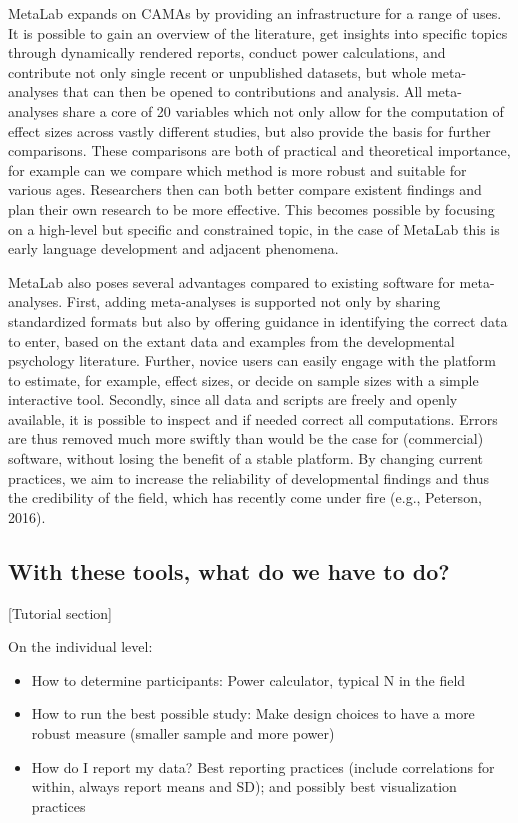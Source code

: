 \documentclass[english,floatsintext,man]{apa6}
\begin{document}
MetaLab expands on CAMAs by providing an infrastructure for a range of
uses. It is possible to gain an overview of the literature, get insights
into specific topics through dynamically rendered reports, conduct power
calculations, and contribute not only single recent or unpublished
datasets, but whole meta-analyses that can then be opened to
contributions and analysis. All meta-analyses share a core of 20
variables which not only allow for the computation of effect sizes
across vastly different studies, but also provide the basis for further
comparisons. These comparisons are both of practical and theoretical
importance, for example can we compare which method is more robust and
suitable for various ages. Researchers then can both better compare
existent findings and plan their own research to be more effective. This
becomes possible by focusing on a high-level but specific and
constrained topic, in the case of MetaLab this is early language
development and adjacent phenomena.

MetaLab also poses several advantages compared to existing software for
meta-analyses. First, adding meta-analyses is supported not only by
sharing standardized formats but also by offering guidance in
identifying the correct data to enter, based on the extant data and
examples from the developmental psychology literature. Further, novice
users can easily engage with the platform to estimate, for example,
effect sizes, or decide on sample sizes with a simple interactive tool.
Secondly, since all data and scripts are freely and openly available, it
is possible to inspect and if needed correct all computations. Errors
are thus removed much more swiftly than would be the case for
(commercial) software, without losing the benefit of a stable platform.
By changing current practices, we aim to increase the reliability of
developmental findings and thus the credibility of the field, which has
recently come under fire (e.g., Peterson, 2016).

\subsection{With these tools, what do we have to
do?}\label{with-these-tools-what-do-we-have-to-do}

{[}Tutorial section{]}

On the individual level:

\begin{itemize}
\itemsep1pt\parskip0pt
\item
  How to determine participants: Power calculator, typical N in the
  field
\item
  How to run the best possible study: Make design choices to have a more
  robust measure (smaller sample and more power)
\item
  How do I report my data? Best reporting practices (include
  correlations for within, always report means and SD); and possibly
  best visualization practices
\end{itemize}
\end{document}
